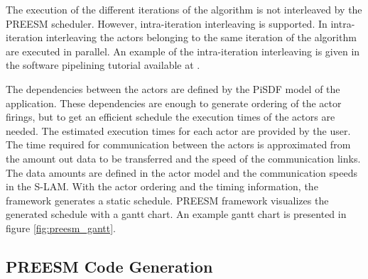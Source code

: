 The execution of the different iterations of the algorithm is not interleaved by the PREESM scheduler. However, intra-iteration interleaving is supported. In intra-iteration interleaving the actors belonging to the same iteration of the algorithm are executed in parallel. \cite{pelcat2014preesm} An example of the intra-iteration interleaving is given in the software pipelining tutorial available at \cite{preesm}.

The dependencies between the actors are defined by the PiSDF model of the application. These dependencies are enough to generate ordering of the actor firings, but to get an efficient schedule the execution times of the actors are needed. The estimated execution times for each actor are provided by the user. The time required for communication between the actors is approximated from the amount out data to be transferred and the speed of the communication links. The data amounts are defined in the actor model and the communication speeds in the S-LAM. With the actor ordering and the timing information, the framework generates a static schedule. \cite{pelcat2014preesm} PREESM framework visualizes the generated schedule with a gantt chart. An example gantt chart is presented in figure \ref{fig:preesm_gantt}.

\subsection{PREESM Code Generation}
\label{sec:preesm-codegen}
